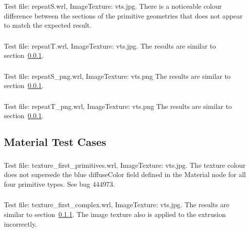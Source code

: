 \setcounter{subsubsection}{27}
\subsubsection{\ITAD}
\label{sec:repeatS}
Test file: repeatS.wrl, ImageTexture: vts.jpg.\newline
There is a noticeable colour difference between the sections of the primitive
geometries that does not appear to match the expected result.

\subsubsection{\ITAE}
Test file: repeatT.wrl, ImageTexture: vts.jpg.\newline
The results are similar to section~\ref{sec:repeatS}.

\setcounter{subsubsection}{32}
\subsubsection{\ITAG}
Test file: repeatS\_png.wrl, ImageTexture: vts.png\newline
The results are similar to section~\ref{sec:repeatS}.

\subsubsection{\ITAH}
Test file: repeatT\_png.wrl, ImageTexture: vts.png\newline
The results are similar to section~\ref{sec:repeatS}.

\subsection{Material Test Cases}

\setcounter{subsubsection}{6}
\subsubsection{\MatGa\MatGb}
\label{sec:pref-colour}
Test file: texture\_first\_primitives.wrl, ImageTexture: vts.jpg.\newline
The texture colour does not supersede the blue diffuseColor field defined
in the Material node for all four primitive types.
See bug 444973.

\subsubsection{\MatHa\MatHb}
Test file: texture\_first\_complex.wrl, ImageTexture: vts.jpg.\newline
The results are similar to section~\ref{sec:pref-colour}.
The image texture also is applied to the extrusion incorrectly.

